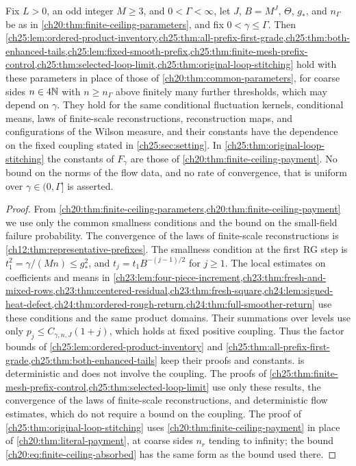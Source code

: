 \begin{lemma}\label{ch25:lem:finite-ceiling-selected-chain}
Fix $L>0$, an odd integer $M\ge3$, and $0<\Gamma<\infty$, let $J$, $B=M^J$, $\Theta$, $g_*$, and $n_\Gamma$ be as in \cref{ch20:thm:finite-ceiling-parameters}, and fix $0<\gamma\le\Gamma$. Then \cref{ch25:lem:ordered-product-inventory,ch25:thm:all-prefix-first-grade,ch25:thm:both-enhanced-tails,ch25:lem:fixed-smooth-prefix,ch25:thm:finite-mesh-prefix-control,ch25:thm:selected-loop-limit,ch25:thm:original-loop-stitching} hold with these parameters in place of those of \cref{ch20:thm:common-parameters}, for coarse sides $n\in4\mathbb N$ with $n\ge n_\Gamma$ above finitely many further thresholds, which may depend on $\gamma$. They hold for the same conditional fluctuation kernels, conditional means, laws of finite-scale reconstructions, reconstruction maps, and configurations of the Wilson measure, and their constants have the dependence on the fixed coupling stated in \cref{ch25:sec:setting}. In \cref{ch25:thm:original-loop-stitching} the constants of $F_\gamma$ are those of \cref{ch20:thm:finite-ceiling-payment}. No bound on the norms of the flow data, and no rate of convergence, that is uniform over $\gamma\in(0,\Gamma]$ is asserted.
\end{lemma}

\begin{proof}
From \cref{ch20:thm:finite-ceiling-parameters,ch20:thm:finite-ceiling-payment} we use only the common smallness conditions and the bound on the small-field failure probability. The convergence of the laws of finite-scale reconstructions is \cref{ch12:thm:representative-prefixes}. The smallness condition at the first RG step is $t_1^2=\gamma/(Mn)\le g_*^2$, and $t_j=t_1B^{-(j-1)/2}$ for $j\ge1$. The local estimates on coefficients and means in \cref{ch23:lem:four-piece-increment,ch23:thm:fresh-and-mixed-rows,ch23:thm:centered-residual,ch23:thm:fresh-square,ch24:lem:signed-heat-defect,ch24:thm:ordered-rough-return,ch24:thm:full-smoother-return} use these conditions and the same product domains. Their summations over levels use only $p_j\le C_{\gamma,n,J}(1+j)$, which holds at fixed positive coupling. Thus the factor bounds of \cref{ch25:lem:ordered-product-inventory} and \cref{ch25:thm:all-prefix-first-grade,ch25:thm:both-enhanced-tails} keep their proofs and constants.  is deterministic and does not involve the coupling. The proofs of \cref{ch25:thm:finite-mesh-prefix-control,ch25:thm:selected-loop-limit} use only these results, the convergence of the laws of finite-scale reconstructions, and deterministic flow estimates, which do not require a bound on the coupling. The proof of \cref{ch25:thm:original-loop-stitching} uses \cref{ch20:thm:finite-ceiling-payment} in place of \cref{ch20:thm:literal-payment}, at coarse sides $n_r$ tending to infinity; the bound \eqref{ch20:eq:finite-ceiling-absorbed} has the same form as the bound used there.
\end{proof}
